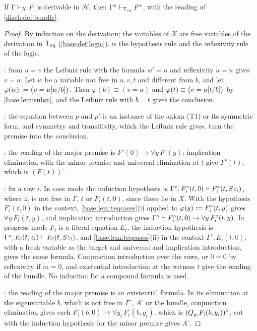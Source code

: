 \begin{lemma}
\label{disch:lem:bundle-sound}
If $\Gamma\vdash_XF$ is derivable in $\mathcal H$, then
$\Gamma^\circ\vdash_{\mathsf{T}_{\mathrm{eq}}}F^\circ$, with the reading of
\cref{disch:def:bundle}.
\end{lemma}

\begin{proof}
By induction on the derivation; the variables of $X$ are free variables of
the derivation in $\mathsf{T}_{\mathrm{eq}}$ (\cref{base:def:logic}).  is the
hypothesis rule and  the reflexivity rule of the logic.

: from $u=v$ the Leibniz rule with the formula $w'=u$ and
reflexivity $u=u$ gives $v=u$. Let $w$ be a variable not free in $u,v,t$
and different from $b$, and let $\varphi(w)\mathrel{:=}\bigl(v=u[w/b]\bigr)$.
Then $\varphi(b)\equiv(v=u)$ and $\varphi(t)\equiv\bigl(v=u[t/b]\bigr)$
by \cref{base:lem:subst}, and the Leibniz rule with $b=t$ gives the
conclusion.

: the equation between $p$ and $p'$ is an instance of the
axiom (T1) or its symmetric form, and symmetry and transitivity, which the
Leibniz rule gives, turn the premise into the conclusion.

: the reading of the major premise is
$F^\circ(0)\to\forall y\,F^\circ(y)$; implication elimination with the minor
premise and universal elimination at $t$ give $F^\circ(t)$, which is
$(F(t))^\circ$.

: fix a row $i$. In case mode the induction hypothesis is
$\Gamma^\circ,F_i^\circ(t,0)\vdash F_i^\circ(t,S z_i)$, where $z_i$ is not
free in $\Gamma$, $t$ or $F_i(t,0)$, since these lie in $X$. With the
hypothesis $F_i^\circ(t,0)$ in the context, \cref{base:lem:teqcases}(i)
applied to $\varphi(y)\mathrel{:=} F_i^\circ(t,y)$ gives $\forall y\,F_i^\circ(t,y)$,
and implication introduction gives
$\Gamma^\circ\vdash F_i^\circ(t,0)\to\forall y\,F_i^\circ(t,y)$. In
progress mode $F_i$ is a literal equation $E_i$, the induction hypothesis
is $\Gamma^\circ,E_i(t,z_i)\vdash E_i(t,S z_i)$, and
\cref{base:lem:teqcases}(ii) in the context $\Gamma^\circ,E_i(t,0)$, with a
fresh variable as the target and universal and implication introduction,
gives the same formula. Conjunction introduction over the rows, or $0=0$ by
reflexivity if $m=0$, and existential introduction at the witness $t$ give
the reading of the bundle. No induction for a compound formula is used.

: the reading of the major premise is an existential
formula. In its elimination at the eigenvariable $b$, which is not free in
$\Gamma^\circ$, $A^\circ$ or the bundle, conjunction elimination gives each
$F_i^\circ(b,0)\to\forall y_i\,F_i^\circ(b,y_i)$, which is
$(Q_{y_i}F_i(b,y_i))^\circ$; cut with the induction hypothesis for the
minor premise gives $A^\circ$.
\end{proof}

